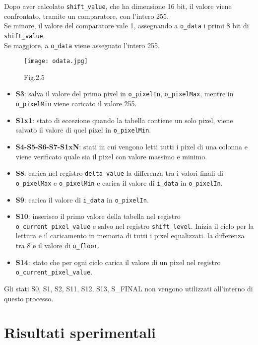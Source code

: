 \documentclass[12pt, table, xcdraw]{article}
\begin{document}
Dopo aver calcolato \texttt{shift\_value}, che ha dimensione 16 bit, il valore viene confrontato, tramite un comparatore, con l'intero 255. \\
Se minore, il valore del comparatore vale 1, assegnando a \texttt{o\_data} i primi 8 bit di \texttt{shift\_value}.\\
Se maggiore, a \texttt{o\_data} viene assegnato l'intero 255. \\

\begin{figure}[h!]
\begin{center}
  \texttt{[image: odata.jpg]}
  \caption*{Fig.2.5}
\end{center}
\end{figure}
\FloatBarrier

\begin{itemize}
\item \textbf{S3}: salva il valore del primo pixel in \texttt{o\_pixelIn}, \texttt{o\_pixelMax}, mentre in \texttt{o\_pixelMin} viene caricato il valore 255.
\item \textbf{S1x1}: stato di eccezione quando la tabella contiene un solo pixel, viene salvato il valore di quel pixel in \texttt{o\_pixelMin}.
\item \textbf{S4-S5-S6-S7-S1xN}: stati in cui vengono letti tutti i pixel di una colonna e viene verificato quale sia il pixel con valore massimo e minimo.
\item \textbf{S8}: carica nel registro \texttt{delta\_value} la differenza tra i valori finali di \texttt{o\_pixelMax} e \texttt{o\_pixelMin} e carica il valore di \texttt{i\_data} in \texttt{o\_pixelIn}.
\item \textbf{S9}: carica il valore di \texttt{i\_data} in \texttt{o\_pixelIn}.
\item \textbf{S10}: inserisco il primo valore della tabella nel registro \texttt{o\_current\_pixel\_value} e salvo nel registro \texttt{shift\_level}. Inizia il ciclo per la lettura e il caricamento in memoria di tutti i pixel equalizzati.
la differenza tra 8 e il valore di \texttt{o\_floor}.
\item \textbf{S14}: stato che per ogni ciclo carica il valore di un pixel nel registro \texttt{o\_current\_pixel\_value}.
\end{itemize}
Gli stati S0, S1, S2, S11, S12, S13, S\_FINAL non vengono utilizzati all'interno di questo processo.
\newpage
\section{Risultati sperimentali}
\end{document}
